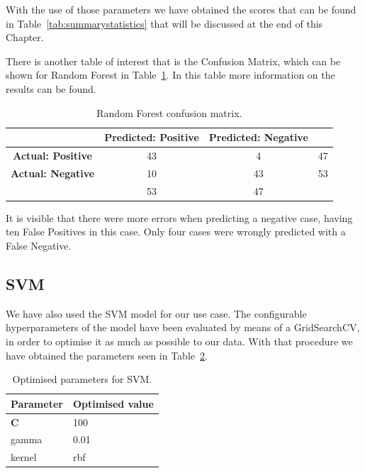 With the use of those parameters we have obtained the scores that can be found in Table~\ref{tab:summarystatistics} that will be discussed at the end of this Chapter.

There is another table of interest that is the Confusion Matrix, which can be shown for Random Forest in Table~\ref{tab:RFconfusion}. In this table more information on the results can be found.
\begin{table}[htp]
\centering
\begin{tabular}{|c|c|c|c|}
\hline
\textbf{}                 & \textbf{Predicted: Positive} & \textbf{Predicted: Negative} &    \\ \hline
\textbf{Actual: Positive} & 43                           & 4                            & 47 \\ \hline
\textbf{Actual: Negative} & 10                           & 43                           & 53 \\ \hline
\textbf{}                 & 53                           & 47                           &    \\ \hline
\end{tabular}
\caption{Random Forest confusion matrix.}
\label{tab:RFconfusion}
\end{table}

It is visible that there were more errors when predicting a negative case, having ten False Positives in this case. Only four cases were wrongly predicted with a False Negative.

\subsection{SVM}
We have also used the SVM model for our use case. The configurable hyperparameters of the model have been evaluated by means of a GridSearchCV, in order to optimise it as much as possible to our data. With that procedure we have obtained the parameters seen in Table~\ref{tab:SVMoptimisedparams}.

\begin{table}[h]
\centering
\begin{tabular}{|l|l|}
\hline
\textbf{Parameter} & \textbf{Optimised value} \\ \hline
\textbf{C}         & 100                      \\ \hline
gamma              & 0.01                     \\ \hline
kernel             & rbf                      \\ \hline
\end{tabular}
\caption{Optimised parameters for SVM.}
\label{tab:SVMoptimisedparams}
\end{table}


